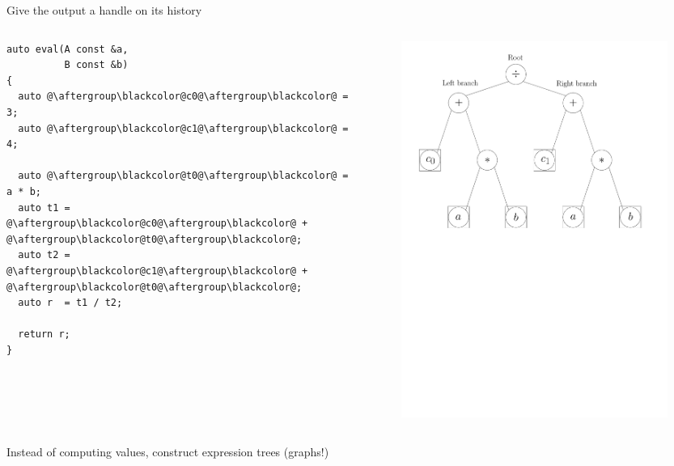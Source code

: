 \documentclass[xcolor=dvipsnames]{beamer}
\begin{document}
\begin{frame}[fragile]{Give the output a handle on its history}
  \begin{columns}[T] %
    \begin{column}{.49\textwidth}
        \begin{lstlisting}
auto eval(A const &a,
          B const &b)
{
  auto @\aftergroup\blackcolor@c0@\aftergroup\blackcolor@ = 3;
  auto @\aftergroup\blackcolor@c1@\aftergroup\blackcolor@ = 4;

  auto @\aftergroup\blackcolor@t0@\aftergroup\blackcolor@ = a * b;
  auto t1 = @\aftergroup\blackcolor@c0@\aftergroup\blackcolor@ + @\aftergroup\blackcolor@t0@\aftergroup\blackcolor@;
  auto t2 = @\aftergroup\blackcolor@c1@\aftergroup\blackcolor@ + @\aftergroup\blackcolor@t0@\aftergroup\blackcolor@;
  auto r  = t1 / t2;

  return r;
}
  \end{lstlisting}
    \end{column}%
    \hfill%
    \begin{column}{0.49\textwidth}
\begin{figure}[H]
 \centering
 \includegraphics[width=0.99\textwidth]{fig_exprtree}
\end{figure}
    \end{column}%
  \end{columns}
  Instead of computing values, construct expression trees (graphs!)
\end{frame}
\end{document}
